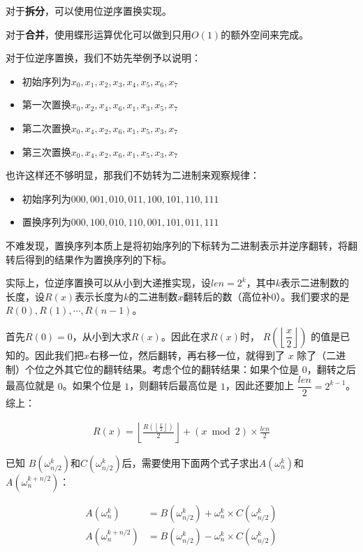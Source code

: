 \documentclass{article}
\begin{document}
对于\textbf{拆分}，可以使用位逆序置换实现。

对于\textbf{合并}，使用蝶形运算优化可以做到只用$O(1)$的额外空间来完成。

对于位逆序置换，我们不妨先举例予以说明：
\begin{itemize}
    \item 初始序列为${x_0,x_1,x_2,x_3,x_4,x_5,x_6,x_7}$
    \item 第一次置换${x_0,x_2,x_4,x_6},{x_1,x_3,x_5,x_7}$
    \item 第二次置换${x_0,x_4},{x_2,x_6},{x_1,x_5},{x_3,x_7}$
    \item 第三次置换${x_0},{x_4},{x_2},{x_6},{x_1},{x_5},{x_3},{x_7}$
\end{itemize}

也许这样还不够明显，那我们不妨转为二进制来观察规律：
\begin{itemize}
    \item 初始序列为${000,001,010,011,100,101,110,111}$
    \item 置换序列为${000,100,010,110,001,101,011,111}$
\end{itemize}

不难发现，置换序列本质上是将初始序列的下标转为二进制表示并逆序翻转，将翻转后得到的结果作为置换序列的下标。

实际上，位逆序置换可以从小到大递推实现，设$len=2^k$，其中$k$表示二进制数的长度，设$R(x)$表示长度为$k$的二进制数$x$翻转后的数（高位补0）。我们要求的是 $R(0),R(1),\cdots,R(n-1)$。

首先$R(0)=0$，从小到大求$R(x)$。因此在求$R(x)$时，
$R\left(\left\lfloor \dfrac{x}{2} \right\rfloor\right)$ 的值是已知的。因此我们把$x$右移一位，然后翻转，再右移一位，就得到了 $x$ 除了（二进制）个位之外其它位的翻转结果。考虑个位的翻转结果：如果个位是 $0$，翻转之后最高位就是 $0$。如果个位是 $1$，则翻转后最高位是 $1$，因此还要加上
$\dfrac{len}{2}=2^{k-1}$。综上：

\begin{equation*}
    \begin{split}
        R(x)=\left\lfloor \frac{R\left(\left\lfloor \frac{x}{2} \right\rfloor\right)}{2} \right\rfloor + (x\bmod 2)\times \frac{len}{2}
    \end{split}
\end{equation*}

已知 
$B(\omega_{n/2}^k)$和$C(\omega_{n/2}^k)$后，需要使用下面两个式子求出$A(\omega_n^k)$和$A(\omega_n^{k+n/2})$：

\begin{equation*}
    \begin{split}
    A(\omega_n^k)       & = B(\omega_{n/2}^k) + \omega_n^k \times C(\omega_{n/2}^k) \\
    A(\omega_n^{k+n/2}) & = B(\omega_{n/2}^k) - \omega_n^k \times C(\omega_{n/2}^k)
    \end{split}
\end{equation*}
\end{document}
